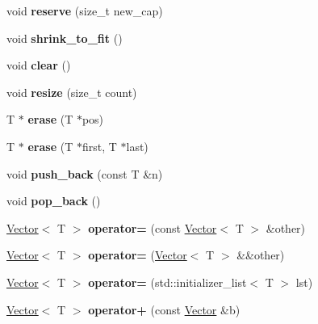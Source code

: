 \begin{DoxyCompactItemize}
void {\bfseries reserve} (size\+\_\+t new\+\_\+cap)
\item 
\mbox{\label{class_vector_ad6454ce193263b8000d4c18cb0c3a0c8}} 
void {\bfseries shrink\+\_\+to\+\_\+fit} ()
\item 
\mbox{\label{class_vector_a32ad98b135472b0ebc5d6cb3ae5d0085}} 
void {\bfseries clear} ()
\item 
\mbox{\label{class_vector_a4ff8f4b766f9e01d53cdd4fd9abcfad6}} 
void {\bfseries resize} (size\+\_\+t count)
\item 
\mbox{\label{class_vector_a5c0ff6d87e1519620d8b114a90aab0af}} 
T $\ast$ {\bfseries erase} (T $\ast$pos)
\item 
\mbox{\label{class_vector_a92876cecd62d9780e077f362dfc5a176}} 
T $\ast$ {\bfseries erase} (T $\ast$first, T $\ast$last)
\item 
\mbox{\label{class_vector_a6e1272f7d7be9854966efc3c63ce9ea5}} 
void {\bfseries push\+\_\+back} (const T \&n)
\item 
\mbox{\label{class_vector_adcba035109febbe55cba2a25f8483ba6}} 
void {\bfseries pop\+\_\+back} ()
\item 
\mbox{\label{class_vector_a0cac5c8c23daa39c8daff7dafa060377}} 
\mbox{\hyperlink{class_vector}{Vector}}$<$ T $>$ {\bfseries operator=} (const \mbox{\hyperlink{class_vector}{Vector}}$<$ T $>$ \&other)
\item 
\mbox{\label{class_vector_a21d426d4811a39d00106080c6747961b}} 
\mbox{\hyperlink{class_vector}{Vector}}$<$ T $>$ {\bfseries operator=} (\mbox{\hyperlink{class_vector}{Vector}}$<$ T $>$ \&\&other)
\item 
\mbox{\label{class_vector_a967c6111982c4e7132d2d063dc63f849}} 
\mbox{\hyperlink{class_vector}{Vector}}$<$ T $>$ {\bfseries operator=} (std\+::initializer\+\_\+list$<$ T $>$ lst)
\item 
\mbox{\label{class_vector_a2429d62203606112a112a390cfefa732}} 
\mbox{\hyperlink{class_vector}{Vector}}$<$ T $>$ {\bfseries operator+} (const \mbox{\hyperlink{class_vector}{Vector}} \&b)

\end{DoxyCompactItemize}
